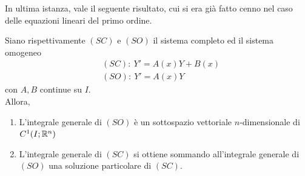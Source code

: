 In ultima istanza, vale il seguente risultato, cui si era già fatto cenno nel caso delle equazioni lineari del primo ordine.
\begin{theorem} \label{Teo: Struttura dell'integrale generale per i sistemi}
    Siano rispettivamente $(SC)$ e $(SO)$ il sistema completo ed il sistema omogeneo
    \begin{align}
        &(SC):\ Y'=A(x)Y+ B(x)\\
        &(SO):\ Y'=A(x)Y
    \end{align}
    con $A, B$ continue su $I$.\\
    Allora,
    \begin{enumerate}
        \item L'integrale generale di $(SO)$ è un sottospazio vettoriale $n$-dimensionale di $C^1(I; \mathbb{R}^n)$
        \item L'integrale generale di $(SC)$ si ottiene sommando all'integrale generale di $(SO)$ una soluzione particolare di $(SC)$.
    \end{enumerate}
\end{theorem}
